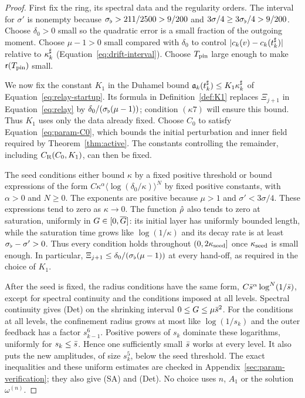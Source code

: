 \begin{proof}
First fix the ring, its spectral data and the regularity orders. The
interval for $\sigma'$ is nonempty because $\sigma_\flat>211/2500>9/200$ and
$3\sigma/4\ge3\sigma_\flat/4>9/200$. Choose $\delta_0>0$ small so the quadratic
error is a small fraction of the outgoing moment. Choose $\mu-1>0$
small compared with $\delta_0$ to control
$|c_k(v)-c_k(t^\sharp_k)|$ relative to $\kappa^\sharp_k$
(Equation~\eqref{eq:drift-interval}). Choose $T_{\mathrm{pin}}$ large enough
to make $\mathsf{r}(T_{\mathrm{pin}})$ small.

We now fix the constant $K_1$ in the Duhamel bound
$\mathfrak{a}_k(t^\sharp_k)\le K_1\kappa^\sharp_k$ of Equation~\eqref{eq:relay-startup}.
Its formula in Definition~\ref{def:K1} replaces $\Xi_{j+1}$ in
Equation~\eqref{eq:relay} by $\delta_0/(\sigma_\flat(\mu-1))$;
condition $(\kappa7)$ will ensure this bound. Thus $K_1$ uses only the data already fixed.
Choose $C_0$ to satisfy Equation~\eqref{eq:param-C0}, which bounds the initial
perturbation and inner field required by Theorem~\ref{thm:active}.
The constants controlling the remainder, including
$C_{\mathrm R}(C_0,K_1)$, can then be fixed.

The seed conditions either bound $\kappa$ by a fixed positive threshold or
bound expressions of the form
$C\kappa^\alpha\langle\log(\delta_0/\kappa)\rangle^N$ by fixed positive
constants, with $\alpha>0$ and $N\ge0$. The exponents are positive because
$\mu>1$ and $\sigma'<3\sigma/4$.
These expressions tend to zero as $\kappa\to0$. The function $\hat\rho$ also
tends to zero at saturation, uniformly in $G\in[0,\overline{G}]$: its initial layer
has uniformly bounded length, while the saturation time grows like
$\log(1/\kappa)$ and its decay rate is at least $\sigma_\flat-\sigma'>0$.
Thus every condition holds throughout $(0,2\kappa_{\mathrm{seed}}]$ once $\kappa_{\mathrm{seed}}$ is small
enough. In particular, $\Xi_{j+1}\le\delta_0/(\sigma_\flat(\mu-1))$ at every
hand-off, as required in the choice of $K_1$.

After the seed is fixed, the radius conditions have the same form,
$C\bar s^\alpha\log^N(1/\bar s)$, except for spectral continuity and the
conditions imposed at all levels. Spectral continuity gives (Det) on the
shrinking interval $0\le G\le\mu\bar s^2$. For the conditions at all levels, the
confinement radius grows at most like $\log(1/s_k)$ and the outer feedback
has a factor $s_{k-1}^6$. Positive powers of $s_k$ dominate these logarithms,
uniformly for $s_k\le\bar s$. Hence one sufficiently small $\bar s$ works at
every level. It also puts the new amplitudes, of size $s_k^5$, below the
seed threshold. The exact inequalities and these uniform estimates are checked
in Appendix~\ref{sec:param-verification}; they also give (SA) and (Det).
No choice uses $n$, $A_1$ or the solution $\omega^{(n)}$.
\end{proof}

